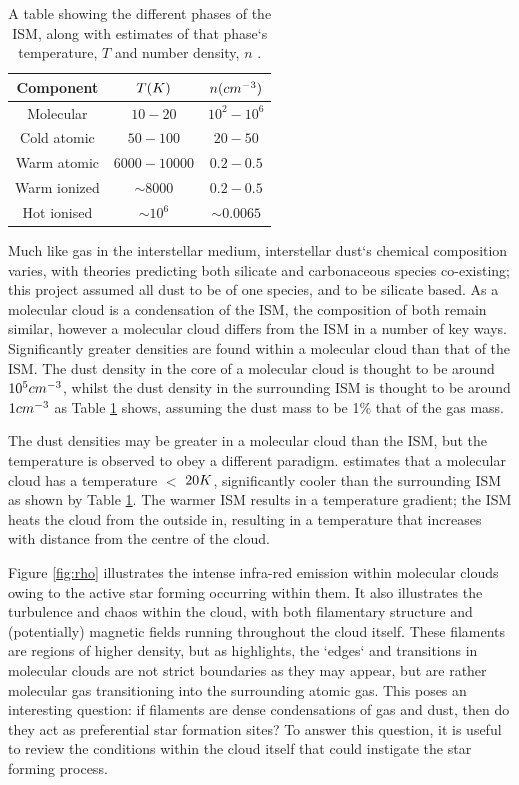 \documentclass{report}
\begin{document}
\begin{table}[h]
  \centering
   \begin{tabular}{||c c c||}
   \hline
   Component & $T\/(K)$ & $n\/(cm^{-3})$ \\ [0.5ex]
   \hline\hline
   Molecular    & $10-20$      & $10^{2}-10^{6}$ \\
   \hline
   Cold atomic  & $50-100$     & $20-50$ \\
   \hline
   Warm atomic  & $6000-10000$ & $0.2-0.5$ \\
   \hline
   Warm ionized & $\sim8000$    & $0.2-0.5$ \\
   \hline
   Hot ionised  & $\sim10^{6}$  & $\sim0.0065$ \\ [1ex]
   \hline
   \end{tabular}
   \caption{A table showing the different phases of the ISM, along with estimates of that phase`s temperature, $T$ and number density, $n$ \parencite{ism}.}
   \label{table:ism}
\end{table}

Much like gas in the interstellar medium, interstellar dust`s chemical composition varies, with theories predicting both silicate and carbonaceous species co-existing; this project assumed all dust to be of one species, and to be silicate based. As a molecular cloud is a condensation of the ISM, the composition of both remain similar, however a molecular cloud differs from the ISM in a number of key ways. Significantly greater densities are found within a molecular cloud than that of the ISM. The dust density in the core of a molecular cloud is thought to be around $10^{5}\/cm^{-3}$, whilst the dust density in the surrounding ISM is thought to be around $1\/cm^{-3}$ as Table \ref{table:ism} shows, assuming the dust mass to be 1\% that of the gas mass.

The dust densities may be greater in a molecular cloud than the ISM, but the temperature is observed to obey a different paradigm. \textcite{dustopacity} estimates that a molecular cloud has a temperature $<$ $20\/K$, significantly cooler than the surrounding ISM as shown by Table \ref{table:ism}. The warmer ISM results in a temperature gradient; the ISM heats the cloud from the outside in, resulting in a temperature that increases with distance from the centre of the cloud.

Figure \ref{fig:rho} illustrates the intense infra-red emission within molecular clouds owing to the active star forming occurring within them. It also illustrates the turbulence and chaos within the cloud, with both filamentary structure and (potentially) magnetic fields running throughout the cloud itself. These filaments are regions of higher density, but as \textcite{evo-mol} highlights, the `edges` and transitions in molecular clouds are not strict boundaries as they may appear, but are rather molecular gas transitioning into the surrounding atomic gas. This poses an interesting question: if filaments are dense condensations of gas and dust, then do they act as preferential star formation sites? To answer this question, it is useful to review the conditions within the cloud itself that could instigate the star forming process.
\end{document}
